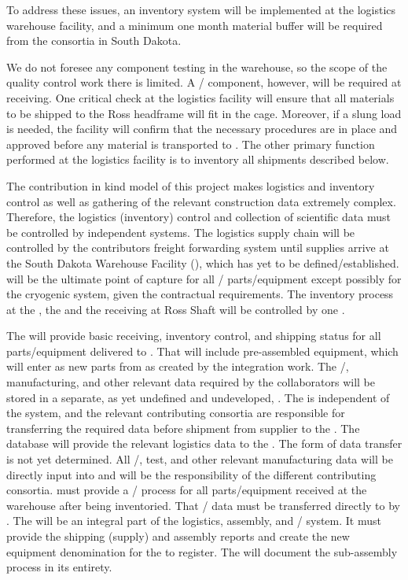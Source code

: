 To address these issues, an inventory system will be implemented at the logistics warehouse facility, and a minimum one month material buffer will be required from the consortia in South Dakota.

We do not foresee any component testing in the warehouse, so the scope of the quality control work there is limited. A / component, however, will be required at receiving. One critical  check at the logistics facility will ensure that all materials to be shipped to the Ross headframe will fit in the cage. Moreover, if a slung load is needed, the facility will confirm that the necessary procedures are in place and approved before any material is transported to . The other primary  function performed at the logistics facility is to inventory all shipments described below.

The contribution in kind model of this project makes logistics and inventory control as well as gathering of the relevant construction data extremely complex. Therefore, the logistics (inventory) control and collection of scientific data must be controlled by independent systems. 
The logistics supply chain will be controlled by the contributors freight forwarding system until supplies arrive at the South Dakota Warehouse Facility (), which has yet to be defined/established.   will be the ultimate point of capture for all / parts/equipment except possibly for the cryogenic system, given the contractual requirements.
The inventory process at the , the  and the  receiving at Ross Shaft will be controlled by one . 


The  will provide basic receiving, inventory control, and shipping status for all parts/equipment delivered to . That will include pre-assembled equipment, which will enter as new parts from  as created by the integration work.
The /, manufacturing, and other relevant data required by the  collaborators will be stored in a separate, as yet undefined and undeveloped, . 
The  is independent of the  system, and the relevant contributing consortia are responsible for transferring the required data before shipment from supplier to the .  The  database will provide the relevant logistics data to the . The form of data transfer is not yet determined.
All /, test, and other relevant manufacturing data will be directly input into  and will be the responsibility of the different contributing consortia.  must provide a / process for all parts/equipment received at the warehouse after being inventoried. That / data must be transferred directly to  by . 
The  will be an integral part of the logistics, assembly, and / system. It must provide the  shipping (supply) and assembly reports and create the new equipment denomination for the  to register.  The  will document the  sub-assembly process in its entirety.


